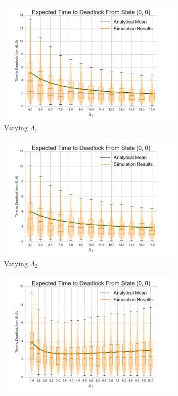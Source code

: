 \documentclass{article}
\numberwithin{equation}{section}
\begin{document}
\begin{figure}[!htbp]
  \begin{subfigure}[b]{0.333\textwidth}
    \includegraphics[width=\textwidth]{images/varyL1_2Nms}
    \caption{Varying $\Lambda_1$}
    \label{fig:2Nms_L1}
  \end{subfigure}
  \begin{subfigure}[b]{0.333\textwidth}
    \includegraphics[width=\textwidth]{images/varyL2_2Nms}
    \caption{Varying $\Lambda_2$}
    \label{fig:2Nms_L2}
  \end{subfigure}
  \begin{subfigure}[b]{0.333\textwidth}
    \includegraphics[width=\textwidth]{images/varymu1_2Nms}

\end{subfigure}
\end{figure}
\end{document}
